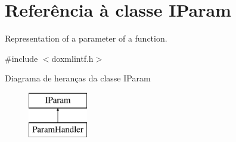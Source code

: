 \hypertarget{class_i_param}{\section{Referência à classe I\-Param}
\label{class_i_param}
}


Representation of a parameter of a function.  




{\ttfamily \#include $<$doxmlintf.\-h$>$}

Diagrama de heranças da classe I\-Param\begin{figure}[H]
\begin{center}
\leavevmode
\includegraphics[height=2.000000cm]{class_i_param}
\end{center}
\end{figure}

